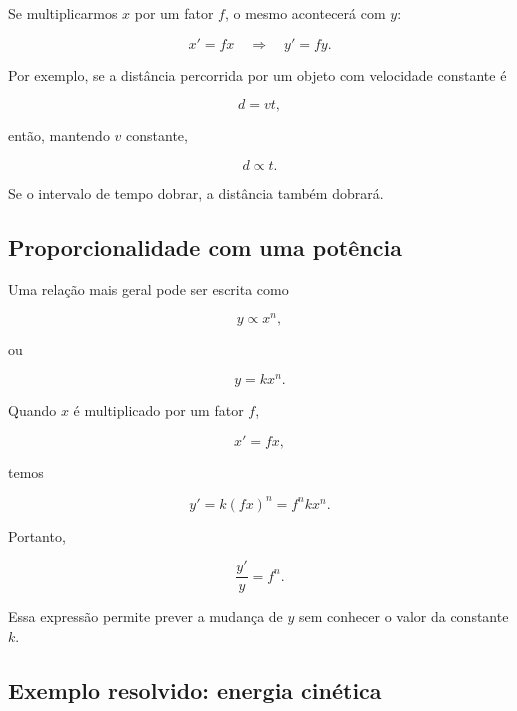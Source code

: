 Se multiplicarmos $x$ por um fator $f$, o mesmo acontecerá com $y$:

\begin{equation}
  x'=fx
  \quad\Rightarrow\quad
  y'=fy.
\end{equation}

Por exemplo, se a distância percorrida por um objeto com velocidade constante é

\begin{equation}
  d=vt,
\end{equation}

então, mantendo $v$ constante,

\begin{equation}
  d\propto t.
\end{equation}

Se o intervalo de tempo dobrar, a distância também dobrará.

\subsection{Proporcionalidade com uma potência}

Uma relação mais geral pode ser escrita como

\begin{equation}
  y\propto x^n,
\end{equation}

ou

\begin{equation}
  y=kx^n.
\end{equation}

Quando $x$ é multiplicado por um fator $f$,

\begin{equation}
  x'=fx,
\end{equation}

temos

\begin{equation}
  y'=k(fx)^n=f^nkx^n.
\end{equation}

Portanto,

\begin{equation}
  \frac{y'}{y}=f^n.
\end{equation}

Essa expressão permite prever a mudança de $y$ sem conhecer o valor da constante $k$.

\subsection*{Exemplo resolvido: energia cinética}

